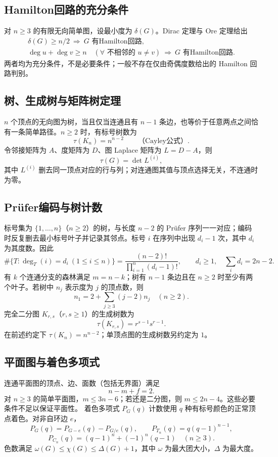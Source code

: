 \documentclass[../main.tex]{subfiles}
\begin{document}
\subsection{Hamilton回路的充分条件}
对 $n\ge3$ 的有限无向简单图，设最小度为 $\delta(G)$。Dirac 定理与 Ore 定理给出
\begin{gather*}
\delta(G)\ge n/2\ \Longrightarrow\ G\text{ 有Hamilton回路},\\
\deg u+\deg v\ge n\quad(\forall\text{ 不相邻的 }u\ne v)
\ \Longrightarrow\ G\text{ 有Hamilton回路}.
\end{gather*}
两者均为充分条件，不是必要条件；一般不存在仅由奇偶度数给出的 Hamilton 回路判别。
\subsection{树、生成树与矩阵树定理}
$n$ 个顶点的无向图为树，当且仅当连通且有 $n-1$ 条边，也等价于任意两点之间恰有一条简单路径。$n\ge2$ 时，有标号树数为
\[
\tau(K_n)=n^{n-2}\qquad\text{（Cayley公式）}.
\]
令邻接矩阵为 $A$、度矩阵为 $D$、图 Laplace 矩阵为 $L=D-A$，则
\[
\tau(G)=\det L^{(i)},
\]
其中 $L^{(i)}$ 删去同一顶点对应的行与列；对连通图其值与顶点选择无关，不连通时为零。
\subsection{Prüfer编码与树计数}
标号集为 $\{1,\ldots,n\}$（$n\ge2$）的树，与长度 $n-2$ 的 Prüfer 序列一一对应；编码时反复删去最小标号叶子并记录其邻点。标号 $i$ 在序列中出现 $d_i-1$ 次，其中 $d_i$ 为其度数。因此
\[
\#\{T:\deg_T(i)=d_i\ (1\le i\le n)\}
=\frac{(n-2)!}{\prod_{i=1}^n(d_i-1)!},
\qquad d_i\ge1,\quad\sum_i d_i=2n-2.
\]
有 $k$ 个连通分支的森林满足 $m=n-k$；树有 $n-1$ 条边且在 $n\ge2$ 时至少有两个叶子。若树中 $n_j$ 表示度为 $j$ 的顶点数，则
\[
n_1=2+\sum_{j\ge3}(j-2)n_j\quad(n\ge2).
\]
完全二分图 $K_{r,s}$（$r,s\ge1$）的生成树数为
\[
\tau(K_{r,s})=r^{s-1}s^{r-1}.
\]
在前述约定下 $\tau(K_n)=n^{n-2}$；单顶点图的生成树数另约定为 $1$。
\subsection{平面图与着色多项式}
连通平面图的顶点、边、面数（包括无界面）满足
\[
n-m+f=2.
\]
对 $n\ge3$ 的简单平面图，$m\le3n-6$；若还是二分图，则 $m\le2n-4$。这些必要条件不足以保证平面性。
着色多项式 $P_G(q)$ 计数使用 $q$ 种有标号颜色的正常顶点着色。对非自环边 $e$，
\[
P_G(q)=P_{G-e}(q)-P_{G/e}(q),\qquad
P_{T_n}(q)=q(q-1)^{n-1},
\]
\[
P_{C_n}(q)=(q-1)^n+(-1)^n(q-1)\quad(n\ge3).
\]
色数满足 $\omega(G)\le\chi(G)\le\Delta(G)+1$，其中 $\omega$ 为最大团大小，$\Delta$ 为最大度。
\end{document}
